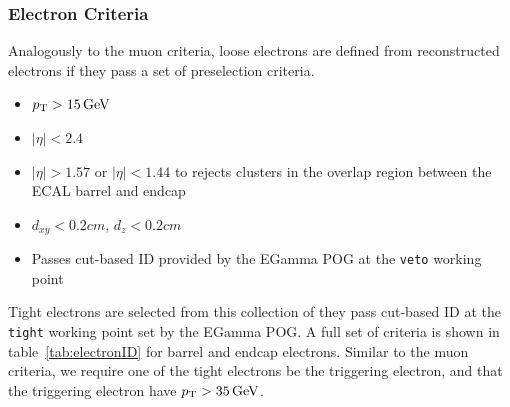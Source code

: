 \subsubsection{Electron Criteria} \label{sec:ana_electrons}
Analogously to the muon criteria, loose electrons are defined from reconstructed electrons if they pass a set of preselection criteria. 
\begin{itemize}
	\item $p_{\mathrm{T}}>15\,\text{Ge\hspace{-.08em}V}$
	\item $|\eta|<2.4$
	\item $|\eta|>1.57\text{ or }|\eta|<1.44$ to rejects clusters in the overlap region between the ECAL barrel and endcap
	\item $d_{xy}<0.2\unit{cm}$, $d_{z}<0.2\unit{cm}$
	\item Passes cut-based ID provided by the EGamma POG at the \texttt{veto} working point
\end{itemize}
Tight electrons are selected from this collection of they pass cut-based ID at the \texttt{tight} working point set by the EGamma POG. A full set of criteria is shown in table~\ref{tab:electronID} for barrel and endcap electrons. Similar to the muon criteria, we require one of the tight electrons be the triggering electron, and that the triggering electron have $p_{\mathrm{T}}>35\,\text{Ge\hspace{-.08em}V}$.

